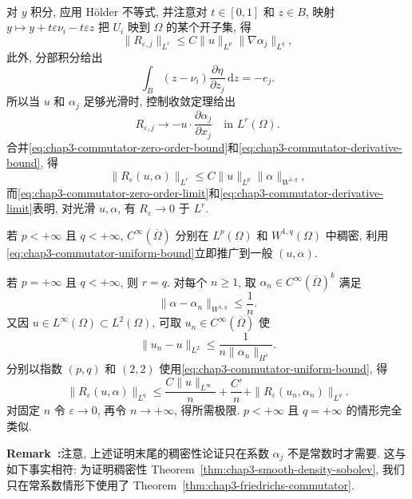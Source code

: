 \begin{Proof}
\[\begin{aligned}
\end{aligned}
\]
对 $y$ 积分, 应用 H\"older 不等式, 并注意对 $t\in[0,1]$ 和 $z\in B$, 映射 $y\mapsto y+t\varepsilon\nu_i-t\varepsilon z$ 把 $U_i$ 映到 $\Omega$ 的某个开子集, 得
\begin{equation}
 \|R_{\varepsilon,j}\|_{L^r}\leq C\|u\|_{L^p}\|\nabla\alpha_j\|_{L^q},
 \label{eq:chap3-commutator-derivative-bound}
\end{equation}
此外, 分部积分给出
\[
 \int_B(z-\nu_i)\frac{\partial\eta}{\partial z_j}\,\mathrm dz=-e_j.
\]
所以当 $u$ 和 $\alpha_j$ 足够光滑时, 控制收敛定理给出
\begin{equation}
 R_{\varepsilon,j}\longrightarrow-u\cdot\frac{\partial\alpha_j}{\partial x_j}
 \quad\text{in }L^r(\Omega).
 \label{eq:chap3-commutator-derivative-limit}
\end{equation}
合并\eqref{eq:chap3-commutator-zero-order-bound}和\eqref{eq:chap3-commutator-derivative-bound}, 得
\begin{equation}
 \|R_\varepsilon(u,\alpha)\|_{L^r}
 \leq C\|u\|_{L^p}\|\alpha\|_{W^{1,q}},
 \label{eq:chap3-commutator-uniform-bound}
\end{equation}
而\eqref{eq:chap3-commutator-zero-order-limit}和\eqref{eq:chap3-commutator-derivative-limit}表明, 对光滑 $u,\alpha$, 有 $R_\varepsilon\to0$ 于 $L^r$.

若 $p<+\infty$ 且 $q<+\infty$, $C^\infty(\overline\Omega)$ 分别在 $L^p(\Omega)$ 和 $W^{1,q}(\Omega)$ 中稠密, 利用\eqref{eq:chap3-commutator-uniform-bound}立即推广到一般 $(u,\alpha)$.

若 $p=+\infty$ 且 $q<+\infty$, 则 $r=q$. 对每个 $n\geq1$, 取 $\alpha_n\in C^\infty(\overline\Omega)^k$ 满足
\[
 \|\alpha-\alpha_n\|_{W^{1,q}}\leq\frac1n.
\]
又因 $u\in L^\infty(\Omega)\subset L^2(\Omega)$, 可取 $u_n\in C^\infty(\overline\Omega)$ 使
\[
 \|u_n-u\|_{L^2}\leq\frac1{n\|\alpha_n\|_{H^1}}.
\]
分别以指数 $(p,q)$ 和 $(2,2)$ 使用\eqref{eq:chap3-commutator-uniform-bound}, 得
\[
 \|R_\varepsilon(u,\alpha)\|_{L^q}
 \leq\frac{C\|u\|_{L^\infty}}n+\frac{C'}n
 +\|R_\varepsilon(u_n,\alpha_n)\|_{L^q}.
\]
对固定 $n$ 令 $\varepsilon\to0$, 再令 $n\to+\infty$, 得所需极限. $p<+\infty$ 且 $q=+\infty$ 的情形完全类似.
\end{Proof}

\par\noindent{}\textbf{Remark~\thechapterthreesectiontworemark:}\label{rem:chap3-commutator-density-caveat}\quad 注意, 上述证明末尾的稠密性论证只在系数 $\alpha_j$ 不是常数时才需要. 这与如下事实相符: 为证明稠密性 Theorem~\ref{thm:chap3-smooth-density-sobolev}, 我们只在常系数情形下使用了 Theorem~\ref{thm:chap3-friedrichs-commutator}.


